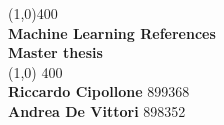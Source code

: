 \documentclass[11pt]{article}
\begin{document}
\begin{titlepage}
\begin{center}
\begin{figure} [H]
\end{figure}
\vfill

\line(1,0){400}\\[1mm]

\huge{\textbf{ Machine Learning References}}\\ [3mm]

\Large{\textbf{ Master thesis}}\\ [1mm]

\line(1,0) {400}\\

\vfill
\centering
\textbf{Riccardo Cipollone} 899368\\
\textbf{Andrea De Vittori } 898352\\







\end{center}

\end{titlepage}
\end{document}
